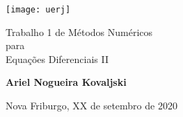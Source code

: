 \begin{titlepage}
    \begin{center}
        \vspace*{1cm}

        \texttt{[image: uerj]}

        {\Huge
           Trabalho 1 de Métodos Numéricos \\
           para \\
           Equações Diferenciais II \par
        }

        \vspace{1.5cm}

        \textbf{Ariel Nogueira Kovaljski}

        \vspace{0.5cm}

        Nova Friburgo, XX de setembro de 2020
        \vfill

    \end{center}
\end{titlepage}